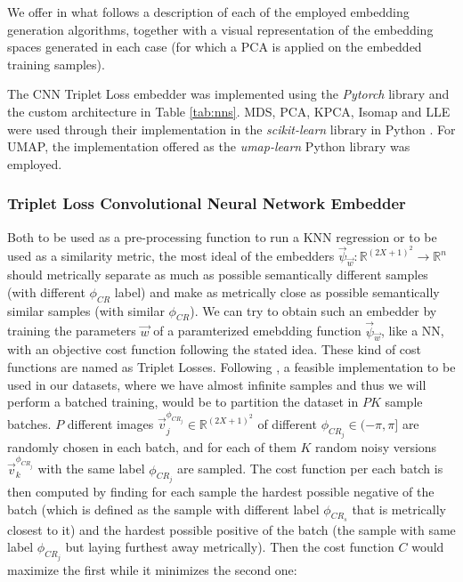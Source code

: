 \documentclass[11pt, a4paper, twoside]{article} %
\newcommand{\R}{\mathbb{R}} %
\begin{document}
We offer in what follows a description of each of the employed embedding generation algorithms, together with a visual representation of the embedding spaces generated in each case (for which a PCA is applied on the embedded training samples).

The CNN Triplet Loss embedder was implemented using the {\em Pytorch} library \cite{pytorch} and the custom architecture in Table \ref{tab:nns}. MDS, PCA, KPCA, Isomap and LLE were used through their implementation in the {\em scikit-learn} library in Python \cite{sklearn}. For UMAP, the implementation offered as the {\em umap-learn} \cite{umaplearn} Python library was employed.\vspace{-0.30cm}
\subsubsection*{Triplet Loss Convolutional Neural Network Embedder}\vspace{-0.15cm}
Both to be used as a pre-processing function to run a KNN regression or to be used as a similarity metric, the most ideal of the embedders $\vec{\psi}_{\vec{w}}:\R^{(2X+1)^2}\rightarrow \R^n$ should metrically separate as much as possible semantically different samples (with different $\phi_{CR}$ label) and make as metrically close as possible semantically similar samples (with similar $\phi_{CR}$). We can try to obtain such an embedder by training the parameters $\vec{w}$ of a paramterized emebdding function $\vec{\psi}_{\vec{w}}$, like a NN, with an objective cost function following the stated idea. These kind of cost functions are named as Triplet Losses. Following \cite{triplet}, a feasible implementation to be used in our datasets, where we have almost infinite samples and thus we will perform a batched training, would be to partition the dataset in $PK$ sample batches. $P$ different images $\vec{v}_j^{\phi_{CR_j}}\in\R^{(2X+1)^2}$ of different $\phi_{CR_j}\in(-\pi,\pi]$ are randomly chosen in each batch, and for each of them $K$ random noisy versions $\vec{v}_k^{\phi_{CR_j}}$ with the same label $\phi_{CR_j}$ are sampled. The cost function per each batch is then computed by finding for each sample the hardest possible negative of the batch (which is defined as the sample with different label $\phi_{CR_s}$ that is metrically closest to it) and the hardest possible positive of the batch (the sample with same label $\phi_{CR_j}$ but laying furthest away metrically). Then the cost function $C$ would maximize the first while it minimizes the second one:\vspace{-0.1cm}
\end{document}
